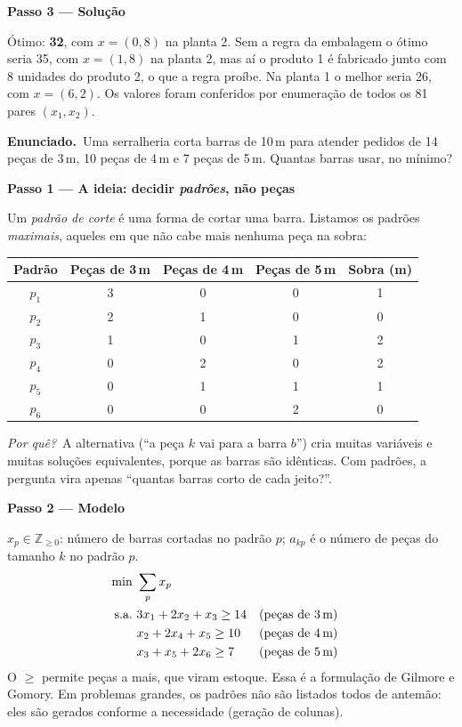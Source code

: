 \documentclass[11pt,a4paper]{article}
\newcommand{\enunciado}{\par\textbf{Enunciado.}\ }
\newcommand{\passo}[1]{\par\medskip\textbf{#1}\par}
\newcommand{\porque}{\textit{Por quê?}\ }
\begin{document}
\passo{Passo 3 --- Solução}
Ótimo: \textbf{32}, com $x=(0, 8)$ na planta 2. Sem a regra da embalagem o ótimo seria 35, com $x=(1, 8)$ na planta 2, mas
aí o produto 1 é fabricado junto com 8 unidades do produto 2, o que a regra proíbe. Na planta 1 o melhor seria 26, com
$x=(6,2)$. Os valores foram conferidos por enumeração de todos os 81 pares $(x_1,x_2)$.

\enunciado Uma serralheria corta barras de 10\,m para atender pedidos de 14 peças de 3\,m, 10 peças de 4\,m e
7 peças de 5\,m. Quantas barras usar, no mínimo?

\passo{Passo 1 --- A ideia: decidir \emph{padrões}, não peças}
Um \emph{padrão de corte} é uma forma de cortar uma barra. Listamos os padrões \emph{maximais}, aqueles em que não cabe
mais nenhuma peça na sobra:
\begin{center}
\begin{tabular}{ccccc}
\toprule
Padrão & Peças de 3\,m & Peças de 4\,m & Peças de 5\,m & Sobra (m)\\
\midrule
$p_1$ & 3 & 0 & 0 & 1\\
$p_2$ & 2 & 1 & 0 & 0\\
$p_3$ & 1 & 0 & 1 & 2\\
$p_4$ & 0 & 2 & 0 & 2\\
$p_5$ & 0 & 1 & 1 & 1\\
$p_6$ & 0 & 0 & 2 & 0\\
\bottomrule
\end{tabular}
\end{center}
\porque A alternativa (``a peça $k$ vai para a barra $b$'') cria muitas variáveis e muitas soluções equivalentes, porque
as barras são idênticas. Com padrões, a pergunta vira apenas ``quantas barras corto de cada jeito?''.

\passo{Passo 2 --- Modelo}
$x_p\in\mathbb{Z}_{\ge0}$: número de barras cortadas no padrão $p$; $a_{kp}$ é o número de peças do tamanho $k$ no padrão $p$.
\begin{align*}
  \min\ & \sum_p x_p\\
  \text{s.a.}\ & 3x_1 + 2x_2 + x_3 \ge 14 && \text{(peças de 3\,m)}\\
  & x_2 + 2x_4 + x_5 \ge 10 && \text{(peças de 4\,m)}\\
  & x_3 + x_5 + 2x_6 \ge 7 && \text{(peças de 5\,m)}
\end{align*}
O $\ge$ permite peças a mais, que viram estoque. Essa é a formulação de Gilmore e Gomory. Em problemas grandes, os padrões
não são listados todos de antemão: eles são gerados conforme a necessidade (geração de colunas).
\end{document}
